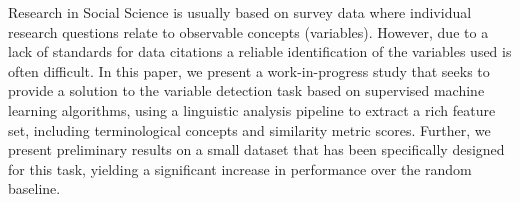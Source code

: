 Research in Social Science is usually based on survey data where individual research questions relate to observable concepts (variables). However, due to a lack of standards for data citations a reliable identification of the variables used is often difficult. In this paper, we present a work-in-progress study that seeks to provide a solution to the variable detection task based on supervised machine learning algorithms, using a linguistic analysis pipeline to extract a rich feature set, including terminological concepts and similarity metric scores. Further, we present preliminary results on a small dataset that has been specifically designed for this task, yielding a significant increase in performance over the random baseline.
